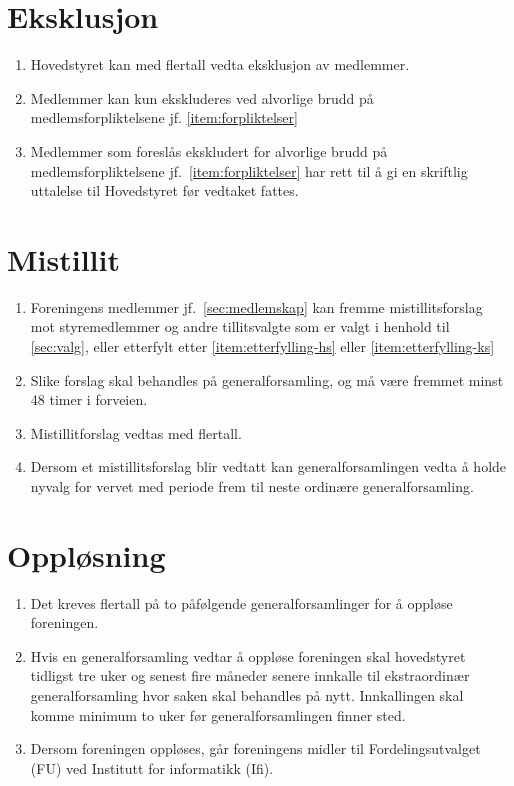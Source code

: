 \documentclass[8pt,norsk,a4paper]{article}
\begin{document}
\section{Eksklusjon}\label{sec:eksklusjon}
\begin{enumerate}
	\item Hovedstyret kan med  flertall vedta eksklusjon av medlemmer.
	\item Medlemmer kan kun ekskluderes ved alvorlige brudd på medlemsforpliktelsene jf. \ref{item:forpliktelser}
	\item Medlemmer som foreslås ekskludert for alvorlige brudd på medlemsforpliktelsene jf.~\ref{item:forpliktelser} har rett til å gi en skriftlig uttalelse til Hovedstyret før vedtaket fattes.
\end{enumerate}

\section{Mistillit}\label{sec:mistillit}
\begin{enumerate}
	\item{Foreningens medlemmer jf.~\ref{sec:medlemskap} kan fremme mistillitsforslag mot styremedlemmer og andre tillitsvalgte som er valgt i henhold til \ref{sec:valg}, eller etterfylt etter \ref{item:etterfylling-hs} eller \ref{item:etterfylling-ks}}
	\item{Slike forslag skal behandles på generalforsamling, og må være fremmet minst 48 timer i forveien.}
	\item{Mistillitforslag vedtas med  flertall.}
	\item{Dersom et mistillitsforslag blir vedtatt kan generalforsamlingen vedta å holde nyvalg for vervet med periode frem til neste ordinære generalforsamling.}
\end{enumerate}

\section{Oppløsning}\label{sec:opplosning}
\begin{enumerate}
        \item{Det kreves  flertall på to påfølgende generalforsamlinger for å oppløse foreningen.}
        \item{Hvis en generalforsamling vedtar å oppløse foreningen skal hovedstyret tidligst tre uker og senest fire måneder senere innkalle til ekstraordinær generalforsamling hvor saken skal behandles på nytt. Innkallingen skal komme minimum to uker før generalforsamlingen finner sted.}
        \item{Dersom foreningen oppløses, går foreningens midler til Fordelingsutvalget (FU) ved Institutt for informatikk (Ifi).}
\end{enumerate}
\end{document}
